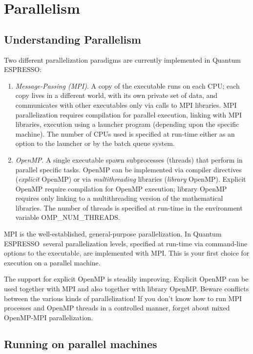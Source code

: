 \documentclass[12pt,a4paper]{article}
\def\qe{{\sc Quantum ESPRESSO}}
\begin{document}
\newpage

\section{Parallelism}
\label{Sec:para}

\subsection{Understanding Parallelism}

Two different parallelization paradigms are currently implemented
in \qe:
\begin{enumerate}
\item {\em Message-Passing (MPI)}. A copy of the executable runs
on each CPU; each copy lives in a different world, with its own
private set of data, and communicates with other executables only
via calls to MPI libraries. MPI parallelization requires compilation
for parallel execution, linking with MPI libraries, execution using
a launcher program (depending upon the specific machine). The number
of CPUs used
is specified at run-time either as an option to the launcher or
by the batch queue system.
\item {\em OpenMP}.  A single executable spawn subprocesses
(threads) that perform in parallel specific tasks.
OpenMP can be implemented via compiler directives ({\em explicit}
OpenMP) or via {\em multithreading} libraries  ({\em library} OpenMP).
Explicit OpenMP require compilation for OpenMP execution;
library OpenMP requires only linking to a multithreading
version of the mathematical libraries.
The number of threads is specified at run-time in the environment
variable OMP\_NUM\_THREADS.
\end{enumerate}

MPI is the well-established, general-purpose parallelization.
In \qe\ several parallelization levels, specified at run-time
via command-line options to the executable, are implemented
with MPI. This is your first choice for execution on a parallel
machine.

The support for explicit OpenMP is steadily improving.
Explicit OpenMP can be used together with MPI and also
together with library OpenMP. Beware
conflicts between the various kinds of parallelization!
If you don't know how to run MPI processes
and OpenMP threads in a controlled manner, forget about mixed
OpenMP-MPI parallelization.

\subsection{Running on parallel machines}
\end{document}
